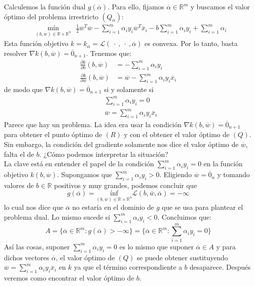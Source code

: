 \documentclass[11pt]{article}
\newcommand{\R}{\mathbb{R}}
\newcommand{\Rn}{\R^{n}}
\newcommand{\Rm}{\R^{m}}
\newcommand{\Rnu}{\R\times\Rn}
\newcommand{\av}{\overline{\alpha}}
\newcommand{\wv}{\overline{w}}
\newcommand{\x}{\overline{x}}
\newcommand{\z}{\overline{0}_{n}}
\newcommand{\La}{\mathcal{L}}
\newcommand{\ali}{\alpha_{i}}
\begin{document}
Calculemos la función dual $g(\av)$. Para ello, fijamos $\av\in\Rm$ y buscamos el valor óptimo del problema irrestricto $(Q_{\av})$:
\begin{equation*}
\begin{aligned}
& \underset{(b, \wv)\in \Rnu}{\text{mín}}\ \ \ \frac{1}{2}\wv^{T}\wv-\sum_{i=1}^{m}\ali y_{i}\wv^{T}\x_{i} -b\sum_{i=1}^{m}\ali y_{i}+\sum_{i=1}^{m}\ali
\end{aligned}
\end{equation*}
Esta función objetivo $k=k_{\av}=\La(\ \cdot\ ,\ \cdot\ ,\av)$ es convexa. Por lo tanto, basta resolver $\nabla k(b, \wv)=\overline{0}_{n+1}$.
Tenemos que:
\begin{equation*}
\begin{aligned}
\frac{\partial k}{\partial b}(b, \wv)&=-\sum_{i=1}^{m}\ali y_{i}\\
\frac{\partial k}{\partial \wv}(b, \wv)&=\wv-\sum_{i=1}^{m}\ali y_{i}\x_{i}
\end{aligned}
\end{equation*}
de modo que $\nabla k(b, \wv)=\overline{0}_{n+1}$ si y solamente si
\begin{equation*}
\begin{aligned}
&\sum_{i=1}^{m}\ali y_{i}=0\\
&\wv=\sum_{i=1}^{m}\ali y_{i}\x_{i}
\end{aligned}
\end{equation*}
Parece que hay un problema. La idea era usar la condición $\nabla k(b, \wv)=\overline{0}_{n+1}$ para obtener el punto óptimo de $(R)$ y con el obtener el valor óptimo de $(Q)$. Sin embargo, la condición del gradiente solamente nos dice el valor óptimo de $\wv$, falta el de $b$. ¿Cómo podemos interpretar la situación?\\

La clave está en entender el papel de la condición $\sum_{i=1}^{m}\ali y_{i}=0$ en la función objetivo $k(b, \wv)$. Supongamos que $\sum_{i=1}^{m}\ali y_{i}>0$. Eligiendo $\wv=\z$ y tomando valores de $b\in\R$ positivos y muy grandes, podemos concluir que
$$g(\av)= \underset{(b, \wv)\in\Rnu}{\text{ínf}}\La(b,\wv,\av)=-\infty$$
lo cual nos dice que $\av$ no estaría en el dominio de $g$ que se usa para plantear el problema dual. Lo mismo sucede si $\sum_{i=1}^{m}\ali y_{i}<0$. Concluimos que:
$$A=\{\av\in\Rm: g(\av)>-\infty\}=\{\av\in\Rm: \sum_{i=1}^{m}\ali y_{i}=0\}$$
Así las cosas, suponer $\sum_{i=1}^{m}\ali y_{i}=0$ es lo mismo que suponer $\av\in A$ y para dichos vectores $\av$, el valor óptimo de $(Q)$ se puede obtener sustituyendo $\wv=\sum_{i=1}^{m}\ali y_{i}\x_{i}$ en $k$ ya que el término correspondiente a $b$ desaparece. Después veremos como encontrar el valor óptimo de $b$.\\
\end{document}

